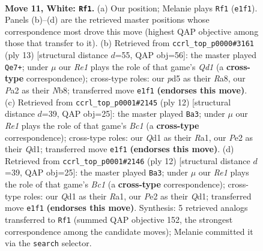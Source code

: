 \documentclass[11pt]{article}
\begin{document}
\clearpage

\begin{figure}[p]\centering
\begin{subfigure}{0.46\textwidth}\centering
\resizebox{\linewidth}{!}{%
\newchessgame
\chessboard[
  setfen={rnbqk2r/6p1/2pb1n2/pp1p1p1p/3P4/4BNP1/PP2PPBP/RN1QR1K1 w kq - 0 11},
  showmover=false,
  pgfstyle=straightmove, color=movearrow, markmove={e1-f1}
]}
\caption{}
\end{subfigure}\hfill
\begin{subfigure}{0.46\textwidth}\centering
\resizebox{\linewidth}{!}{%
\newchessgame
\chessboard[
  setfen={rnbqkb1r/1pp2p1p/p4np1/2Pp4/3P4/3B1N2/PP3PPP/RNBQK2R b KQkq - 1 7},
  showmover=false,
  pgfstyle=straightmove, color=movearrow, markmove={d8-e7}
]}
\caption{}
\end{subfigure}
\\[4pt]
\begin{subfigure}{0.46\textwidth}\centering
\resizebox{\linewidth}{!}{%
\newchessgame
\chessboard[
  setfen={rnbqk2r/pp4pp/2pbpn2/3p1p2/3P4/1P3NP1/P1P1PPBP/RNBQ1RK1 w kq - 2 7},
  showmover=false,
  pgfstyle=straightmove, color=movearrow, markmove={c1-a3}
]}
\caption{}
\end{subfigure}\hfill
\begin{subfigure}{0.46\textwidth}\centering
\resizebox{\linewidth}{!}{%
\newchessgame
\chessboard[
  setfen={rnbqk2r/pp4pp/2pbpn2/3p1p2/3P4/1P3NP1/P1P1PPBP/RNBQ1RK1 w kq - 2 7},
  showmover=false,
  pgfstyle=straightmove, color=movearrow, markmove={c1-a3}
]}
\caption{}
\end{subfigure}
\caption{\textbf{Move 11, White: \texttt{Rf1}.} (a) Our position; Melanie plays \texttt{Rf1} (\texttt{e1f1}). Panels (b)--(d) are the retrieved master positions whose correspondence most drove this move (highest QAP objective among those that transfer to it). (b) Retrieved from \texttt{ccrl\_top\_p0000\#3161} (ply 13) [structural distance $d$=55, QAP obj=56]: the master played \texttt{Qe7+}; under $\mu$ our \emph{Re1} plays the role of that game's \emph{Qd1} (a \textbf{cross-type} correspondence); cross-type roles: our \emph{p}d5 as their \emph{R}a8, our \emph{P}a2 as their \emph{N}b8; transferred move \texttt{e1f1} \textbf{(endorses this move)}. (c) Retrieved from \texttt{ccrl\_top\_p0001\#2145} (ply 12) [structural distance $d$=39, QAP obj=25]: the master played \texttt{Ba3}; under $\mu$ our \emph{Re1} plays the role of that game's \emph{Bc1} (a \textbf{cross-type} correspondence); cross-type roles: our \emph{Q}d1 as their \emph{R}a1, our \emph{P}e2 as their \emph{Q}d1; transferred move \texttt{e1f1} \textbf{(endorses this move)}. (d) Retrieved from \texttt{ccrl\_top\_p0001\#2146} (ply 12) [structural distance $d$=39, QAP obj=25]: the master played \texttt{Ba3}; under $\mu$ our \emph{Re1} plays the role of that game's \emph{Bc1} (a \textbf{cross-type} correspondence); cross-type roles: our \emph{Q}d1 as their \emph{R}a1, our \emph{P}e2 as their \emph{Q}d1; transferred move \texttt{e1f1} \textbf{(endorses this move)}. Synthesis: 5 retrieved analogs transferred to \texttt{Rf1} (summed QAP objective 152, the strongest correspondence among the candidate moves); Melanie committed it via the \texttt{search} selector.}

\end{figure}
\end{document}
